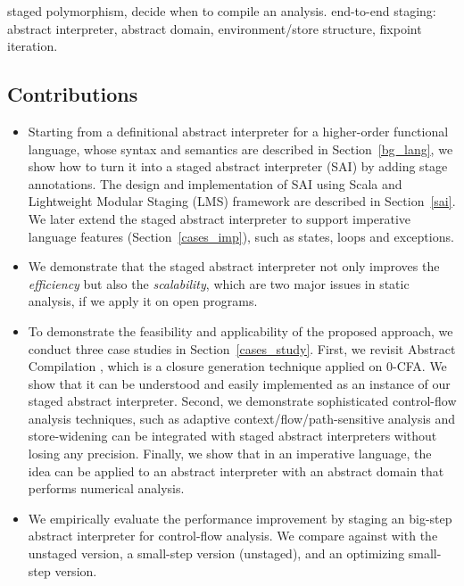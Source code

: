 staged polymorphism, decide when to compile an analysis.  
end-to-end staging: abstract interpreter, abstract domain, environment/store structure, fixpoint iteration.

\subsection{Contributions}

\begin{itemize}
\item Starting from a definitional abstract interpreter for a higher-order functional language,
  whose syntax and semantics are described in Section~\ref{bg_lang},
  we show how to turn it into a staged abstract interpreter (SAI) by adding stage annotations. 
  The design and implementation of SAI using Scala and Lightweight Modular Staging (LMS) framework 
  are described in Section~\ref{sai}.
  We later extend the staged abstract interpreter to support imperative language features 
  (Section~\ref{cases_imp}), such as states, loops and exceptions.
\item We demonstrate that the staged abstract interpreter not only improves the \textit{efficiency}
  but also the \textit{scalability}, which are two major issues in static analysis, if we apply it on open
  programs. 
\item To demonstrate the feasibility and applicability of the proposed approach, we conduct three case studies in Section~\ref{cases_study}. 
  First, we revisit Abstract Compilation \cite{Boucher:1996:ACN:647473.727587}, which is a closure generation 
  technique applied on 0-CFA. We show that it can be understood and easily implemented as an instance of 
  our staged abstract interpreter. 
  Second, we demonstrate sophisticated control-flow analysis techniques, such as adaptive context/flow/path-sensitive 
  analysis and store-widening can be integrated with staged abstract interpreters without losing any precision.
  Finally, we show that in an imperative language, the idea can be applied to an abstract interpreter with
  an abstract domain that performs numerical analysis.
\item We empirically evaluate the performance improvement by staging an big-step abstract interpreter 
  for control-flow analysis. We compare against with the unstaged version, a small-step version (unstaged), 
  and an optimizing small-step version.
\end{itemize}
